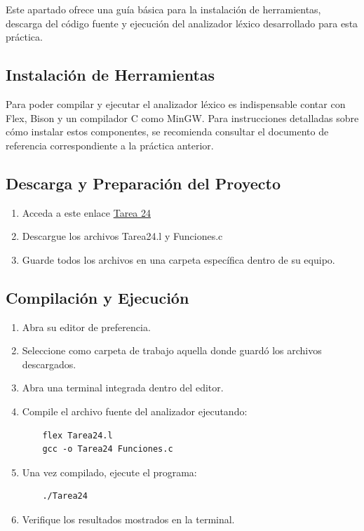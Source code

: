 \documentclass{article}
\begin{document}
Este apartado ofrece una guía básica para la instalación de herramientas, descarga del código fuente y ejecución del analizador léxico desarrollado para esta práctica.

\subsection{Instalación de Herramientas}

Para poder compilar y ejecutar el analizador léxico es indispensable contar con Flex, Bison y un compilador C como MinGW. Para instrucciones detalladas sobre cómo instalar estos componentes, se recomienda consultar el documento de referencia correspondiente a la práctica anterior.

\subsection{Descarga y Preparación del Proyecto}

\begin{enumerate}
    \item Acceda a este enlace \href{https://github.com/JavierTarazona06/LP02_Tareas/tree/main/Tarea24/Code}{Tarea 24}
    \item Descargue los archivos Tarea24.l y Funciones.c
    \item Guarde todos los archivos en una carpeta específica dentro de su equipo.
\end{enumerate}

\subsection{Compilación y Ejecución}

\begin{enumerate}
    \item Abra su editor de preferencia.
    \item Seleccione como carpeta de trabajo aquella donde guardó los archivos descargados.
    \item Abra una terminal integrada dentro del editor.
    \item Compile el archivo fuente del analizador ejecutando:
    \begin{verbatim}
    flex Tarea24.l
    gcc -o Tarea24 Funciones.c
    \end{verbatim}
    \item Una vez compilado, ejecute el programa:
    \begin{verbatim}
    ./Tarea24
    \end{verbatim}
    \item Verifique los resultados mostrados en la terminal.
\end{enumerate}
\end{document}
